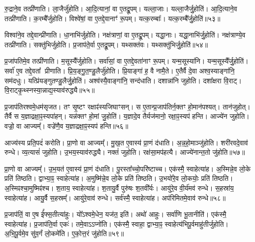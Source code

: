 रु॒द्राने॒व तत्प्री॑णाति।
ला॒जैर्जु॑होति।
आ॒दि॒त्यानां॒ वा ए॒तद्रू॒पम्।
यल्ला॒जाः।
यल्ला॒जैर्जु॒होति॑।
आ॒दि॒त्याने॒व तत्प्री॑णाति।
क॒रम्बै᳚र्जुहोति।
विश्वे॑षां॒ वा ए॒तद्दे॒वानाꣳ॑ रू॒पम्।
यत्क॒रम्बाः᳚।
यत्क॒रम्बै᳚र्जु॒होति॑॥५३॥

विश्वा॑ने॒व तद्दे॒वान्प्री॑णाति।
धा॒नाभि॑र्जुहोति।
नक्ष॑त्राणां॒ वा ए॒तद्रू॒पम्।
यद्धा॒नाः।
यद्धा॒नाभि॑र्जु॒होति॑।
नक्ष॑त्राण्ये॒व तत्प्री॑णाति।
सक्तु॑भिर्जुहोति।
प्र॒जाप॑ते॒र्वा ए॒तद्रू॒पम्।
यथ्सक्त॑वः।
यथ्सक्तु॑भिर्जु॒होति॑॥५४॥

प्र॒जा॑पतिमे॒व तत्प्री॑णाति।
म॒सूस्यै᳚र्जुहोति।
सर्वा॑सां॒ वा ए॒तद्दे॒वता॑नाꣳ रू॒पम्।
यन्म॒सूस्या॑नि।
यन्म॒सूस्यै᳚र्जु॒होति॑।
सर्वा॑ ए॒व तद्दे॒वता᳚ प्रीणाति।
प्रि॒य॒ङ्गु॒त॒ण्डु॒लैर्जु॑होति।
प्रि॒याङ्गा॑ ह॒ वै नामै॒ते।
ए॒तैर्वै दे॒वा अश्व॒स्याङ्गा॑नि॒ सम॑दधुः।
यत्प्रि॑यङ्गुतण्डु॒लैर्जु॒होति॑।
अश्व॑स्यै॒वाङ्गा॑नि॒ सन्द॑धाति।
दशान्ना॑नि जुहोति।
दशा᳚क्षरा वि॒राट्।
वि॒राट्कृ॒थ्स्नस्या॒न्नाद्य॒स्याव॑रुद्ध्यै॥५५॥\anuvakamend[जु॒होति॒ मधु॑ना जु॒होति॒ पृथु॑कैर्जु॒होति॑ क॒रम्बै᳚र्जु॒होति॒ सक्तु॑भिर्जु॒होति॑ प्रियङ्गुतण्डु॒लैर्जु॒होति॑ च॒त्वारि॑ च (अ॒न्नहो॒मानाऽऽज्ये॑ना॒ग्नेर्मधु॑ना तण़्डु॒लैः पृथु॑कैर्ला॒जैः क॒रम्बै᳚र्धा॒नाभिः॒ सक्तु॑भिर्म॒सूस्यै᳚ प्रियङ्गुतण्डु॒लैर्द॒शान्ना॑नि॒ द्वाद॑श।
)]

प्र॒जाप॑तिरश्वमे॒धम॑सृजत।
तꣳ सृ॒ष्टꣳ रक्षाꣴ॑स्यजिघाꣳसन्।
स ए॒तान्प्र॒जाप॑तिर्न॒क्तꣳ हो॒मान॑पश्यत्।
तान॑जुहोत्।
तैर्वै स य॒ज्ञाद्रक्षा॒ꣴ॒स्यपा॑हन्।
यन्न॑क्तꣳ हो॒मां जु॒होति॑।
य॒ज्ञादे॒व तैर्यज॑मानो॒ रक्षा॒ꣴ॒स्यप॑ हन्ति।
आज्ये॑न जुहोति।
वज्रो॒ वा आज्यम्᳚।
वज्रे॑णै॒व य॒ज्ञाद्रक्षा॒ꣴ॒स्यप॑ हन्ति॥५६॥

आज्य॑स्य प्रति॒पदं॑ करोति।
प्रा॒णो वा आज्यम्᳚।
मु॒ख॒त ए॒वास्य॑ प्रा॒णं द॑धाति।
अ॒न्न॒हो॒माञ्जु॑होति।
शरी॑रवदे॒वाव॑ रुन्धे।
व्य॒त्यासं॑ जुहोति।
उ॒भय॒स्याव॑रुद्ध्यै।
नक्तं॑ जुहोति।
रक्ष॑सा॒मप॑हत्यै।
आज्ये॑नान्त॒तो जु॑होति॥५७॥

प्रा॒णो वा आज्यम्᳚।
उ॒भ॒यत॑ ए॒वास्य॑ प्रा॒णं द॑धाति।
पु॒रस्ता᳚च्चो॒परि॑ष्टाच्च।
एक॑स्मै॒ स्वाहेत्या॑ह।
अ॒स्मिन्ने॒व लो॒के प्रति॑ तिष्ठति।
द्वाभ्या॒ꣴ॒ स्वाहेत्या॑ह।
अ॒मुष्मि॑न्ने॒व लो॒के प्रति॑ तिष्ठति।
उ॒भयो॑रे॒व लो॒कयोः॒ प्रति॑ तिष्ठति।
अ॒स्मिꣴश्चा॒मुष्मिꣴ॑श्च।
श॒ताय॒ स्वाहेत्या॑ह।
श॒तायु॒र्वै पुरु॑षः श॒तवी᳚र्यः।
आयु॑रे॒व वी॒र्य॑मव॑ रुन्धे।
स॒हस्रा॑य॒ स्वाहेत्या॑ह।
आयु॒र्वै स॒हस्रम्᳚।
आयु॑रे॒वाव॑ रुन्धे।
सर्व॑स्मै॒ स्वाहेत्या॑ह।
अप॑रिमितमे॒वाव॑ रुन्धे॥५८॥\anuvakamend[ए॒व य॒ज्ञाद्रक्षा॒ꣴ॒स्यप॑हन्त्यन्त॒तो जु॑होति श॒ताय॒ स्वाहेत्या॑ह स॒प्त च॑]

प्र॒जाप॑तिं॒ वा ए॒ष ई᳚फ्स॒तीत्या॑हुः।
यो᳚ऽश्वमे॒धेन॒ यज॑त॒ इति॑।
अथो॑ आहुः।
सर्वा॑णि भू॒तानीति॑।
एक॑स्मै॒ स्वाहेत्या॑ह।
प्र॒जाप॑ति॒र्वा एकः॑।
तमे॒वाऽऽप्नो॑ति।
एक॑स्मै॒ स्वाहा॒ द्वाभ्या॒ꣴ॒ स्वाहेत्य॑भिपू॒र्वमाहु॑तीर्जुहोति।
अ॒भि॒पू॒र्वमे॒व सु॑व॒र्गं लो॒कमे॑ति।
ए॒को॒त्त॒रं जु॑होति॥५९॥

